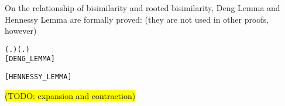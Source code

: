 On the relationship of bisimilarity and rooted bisimilarity, Deng Lemma and Hennessy Lemma are
formally proved: (they are not used in other proofs, however)
\begin{alltt}
\HOLTokenTurnstile{}  \HOLSymConst{\HOLTokenWeakEQ}  \HOLSymConst{\HOLTokenImp{}}
   (\HOLSymConst{\HOLTokenExists{}}.  \HOLTokenTransBegin\HOLSymConst{\ensuremath{\tau}}\HOLTokenTransEnd {} \HOLSymConst{\HOLTokenConj{}}  \HOLSymConst{\HOLTokenWeakEQ} ) \HOLSymConst{\HOLTokenDisj{}} (\HOLSymConst{\HOLTokenExists{}}.  \HOLTokenTransBegin\HOLSymConst{\ensuremath{\tau}}\HOLTokenTransEnd {} \HOLSymConst{\HOLTokenConj{}}  \HOLSymConst{\HOLTokenWeakEQ} ) \HOLSymConst{\HOLTokenDisj{}}
    \HOLSymConst{\HOLTokenObsCongr} \hfill{[DENG_LEMMA]}
  
\HOLTokenTurnstile{}  \HOLSymConst{\HOLTokenWeakEQ}  \HOLSymConst{\HOLTokenEquiv{}}  \HOLSymConst{\HOLTokenObsCongr}  \HOLSymConst{\HOLTokenDisj{}}  \HOLSymConst{\HOLTokenObsCongr} \HOLSymConst{\ensuremath{\tau}} \HOLSymConst{\HOLTokenDisj{}} \HOLSymConst{\ensuremath{\tau}} \HOLSymConst{\HOLTokenObsCongr} \hfill{[HENNESSY_LEMMA]}
\end{alltt}

\hl{(TODO: expansion and contraction)}

